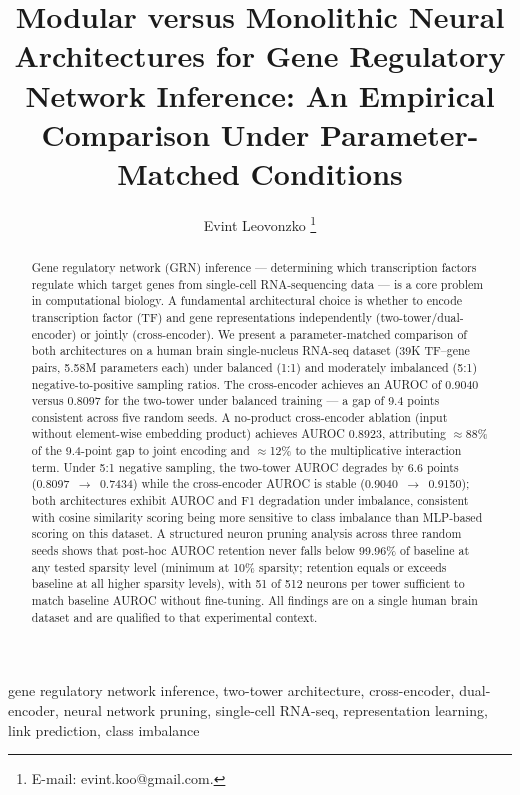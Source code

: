 \documentclass[journal]{IEEEtran}
\begin{document}
\title{Modular versus Monolithic Neural Architectures for Gene Regulatory
Network Inference: An Empirical Comparison Under Parameter-Matched Conditions}

\author{Evint Leovonzko%
\thanks{E-mail: evint.koo@gmail.com.}}

\maketitle

\begin{abstract}
Gene regulatory network (GRN) inference --- determining which transcription
factors regulate which target genes from single-cell RNA-sequencing data --- is
a core problem in computational biology. A fundamental architectural choice is
whether to encode transcription factor (TF) and gene representations
independently (two-tower/dual-encoder) or jointly (cross-encoder). We present
a parameter-matched comparison of both architectures on a human brain
single-nucleus RNA-seq dataset (39K TF--gene pairs, 5.58M parameters each)
under balanced (1:1) and moderately imbalanced (5:1) negative-to-positive
sampling ratios. The cross-encoder achieves an AUROC of 0.9040 versus 0.8097
for the two-tower under balanced training --- a gap of 9.4 points consistent
across five random seeds. A no-product cross-encoder ablation (input without
element-wise embedding product) achieves AUROC 0.8923, attributing
$\approx$88\% of the 9.4-point gap to joint encoding and $\approx$12\% to
the multiplicative interaction term. Under 5:1 negative sampling, the
two-tower AUROC degrades by 6.6 points (0.8097~$\to$~0.7434) while the
cross-encoder AUROC is stable (0.9040~$\to$~0.9150); both architectures
exhibit AUROC and F1 degradation under imbalance, consistent with cosine
similarity scoring being more sensitive to class imbalance than MLP-based
scoring on this dataset. A structured neuron pruning analysis across three
random seeds shows that post-hoc AUROC retention never falls below 99.96\% of
baseline at any tested sparsity level (minimum at 10\% sparsity; retention
equals or exceeds baseline at all higher sparsity levels), with 51 of 512
neurons per tower sufficient to match baseline AUROC without fine-tuning.
All findings are on a single human brain dataset and are qualified to that
experimental context.
\end{abstract}

\begin{IEEEkeywords}
gene regulatory network inference, two-tower architecture, cross-encoder,
dual-encoder, neural network pruning, single-cell RNA-seq, representation
learning, link prediction, class imbalance
\end{IEEEkeywords}
\end{document}
